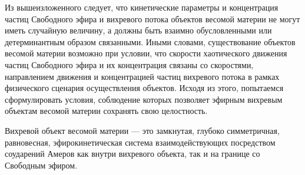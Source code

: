 Из вышеизложенного следует, что кинетические параметры и концентрация частиц Свободного эфира и вихревого потока объектов весомой материи не могут иметь случайную величину, а должны быть взаимно обусловленными или детерминантным образом связанными. Иными словами, существование объектов весомой материи возможно при условии, что скорости хаотического движения частиц Свободного эфира и их концентрация связаны со скоростями, направлением движения и концентрацией частиц вихревого потока в рамках физического сценария осуществления объектов. Исходя из этого, попытаемся сформулировать условия, соблюдение которых позволяет эфирным вихревым объектам весомой материи сохранять свою целостность.

Вихревой объект весомой материи — это замкнутая, глубоко симметричная, равновесная, эфирокинетическая система взаимодействующих посредством соударений Амеров как внутри вихревого объекта, так и на границе со Свободным эфиром.
